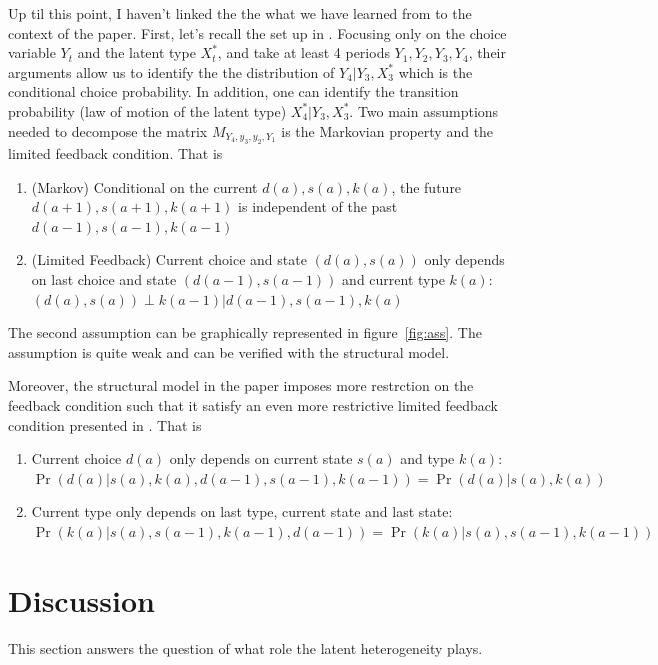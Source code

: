\documentclass[12pt]{article}
\begin{document}
Up til this point, I haven't linked the the what we have learned from \citet{hu2012nonparametric} to the context of the paper. First, let's recall the set up in \citet{hu2012nonparametric}.
Focusing only on the choice variable $Y_t$ and the latent type $X^*_t$, and take at least 4 periods $Y_1, Y_2,Y_3,Y_4$, their arguments allow us to identify the the distribution of $Y_4|Y_3,X_3^*$ which is the conditional choice probability. In addition, one can identify the transition probability (law of motion of the latent type) $X_4^*|Y_3,X_3^*$. Two main assumptions needed to decompose the matrix $M_{Y_4,y_3,y_2,Y_1}$ is the Markovian property and the limited feedback condition. That is 
\begin{enumerate}
    \item (Markov) Conditional on the current $d(a),s(a),k(a)$, the future $d(a+1),s(a+1),k(a+1)$ is independent of the past $d(a-1),s(a-1),k(a-1)$
    \item (Limited Feedback) Current choice and state $(d(a),s(a))$ only depends on last choice and state $(d(a-1),s(a-1))$ and current type $k(a)$:  $(d(a),s(a))\perp k(a-1)|d(a-1),s(a-1),k(a)$
\end{enumerate}
The second assumption can be graphically represented in figure~\ref{fig:ass}. The assumption is quite weak and can be verified with the structural model. 

Moreover, the structural model in the paper imposes more restrction on the feedback condition such that it satisfy an even more restrictive limited feedback condition presented in \citet{hu2017simple}. That is 
\begin{enumerate}
    \item Current choice $d(a)$ only depends on current state $s(a)$ and type $k(a)$: $\Pr(d(a)|s(a),k(a),d(a-1),s(a-1),k(a-1))=\Pr(d(a)|s(a),k(a))$
\item Current type only depends on last type, current state and last state: $\Pr(k(a)|s(a),s(a-1),k(a-1),d(a-1))=\Pr(k(a)|s(a),s(a-1),k(a-1))$
\end{enumerate}


\section{Discussion}
This section answers the question of what role the latent heterogeneity plays.

\pagebreak \newpage 
\end{document}
